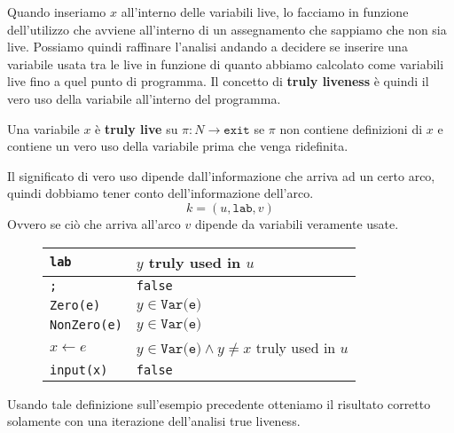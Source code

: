 Quando inseriamo $x$ all'interno delle variabili live, lo facciamo in funzione dell'utilizzo che avviene 
all'interno di un assegnamento che sappiamo che non sia live. Possiamo quindi raffinare l'analisi 
andando a decidere se inserire una variabile usata tra le live in funzione di quanto abbiamo calcolato come 
variabili live fino a quel punto di programma.
Il concetto di \textbf{truly liveness} è quindi il vero uso della variabile all'interno del programma. 

\begin{tcolorbox}[title = True liveness]
    Una variabile $x$ è \textbf{truly live} su $\pi: N \to \texttt{exit}$ 
    se $\pi$ non contiene definizioni di $x$ e contiene un vero uso 
    della variabile prima che venga ridefinita.
\end{tcolorbox}

Il significato di vero uso dipende dall'informazione che arriva ad un certo arco,
quindi dobbiamo tener conto dell'informazione dell'arco.
\[
    k = (u, \texttt{lab}, v)
\]
Ovvero se ciò che arriva all'arco $v$ dipende da variabili veramente usate.
\begin{figure}[H]
    \centering
    \begin{tabular}{l|l}
    \texttt{lab} & $y$ truly used in $u$\\
    \hline
    \texttt{;} & \texttt{false}\\
    \texttt{Zero(e)} & $y \in \texttt{Var(e)}$\\
    \texttt{NonZero(e)} & $y \in \texttt{Var(e)}$\\
    \texttt{$x \gets e$} & $y \in \texttt{Var(e)} \land y \neq x$ truly used in $u$\\
    \texttt{\texttt{input(x)}} & \texttt{false}\\
    \end{tabular}
\end{figure}
Usando tale definizione sull'esempio precedente otteniamo il risultato corretto 
solamente con una iterazione dell'analisi true liveness.
